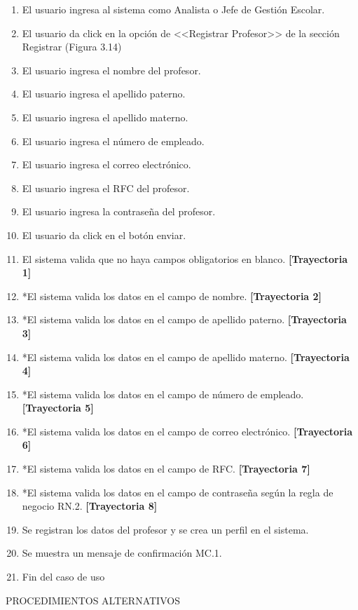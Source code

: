 \begin{enumerate}
    \item El usuario ingresa al sistema como Analista o Jefe de Gestión Escolar.
    \item El usuario da click en la opción de <<Registrar Profesor>> de la sección Registrar (Figura 3.14)
    \item El usuario ingresa el nombre del profesor.
    \item El usuario ingresa el apellido paterno.
    \item El usuario ingresa el apellido materno.
    \item El usuario ingresa el número de empleado.
    \item El usuario ingresa el correo electrónico.
    \item El usuario ingresa el RFC del profesor.
    \item El usuario ingresa la contraseña del profesor.
    \item El usuario da click en el botón enviar.
    \item El sistema valida que no haya campos obligatorios en blanco. \textbf{[Trayectoria 1]}
    \item *El sistema valida los datos en el campo de nombre. \textbf{[Trayectoria 2]}
    \item *El sistema valida los datos en el campo de apellido paterno. \textbf{[Trayectoria 3]}
    \item *El sistema valida los datos en el campo de apellido materno. \textbf{[Trayectoria 4]}
    \item *El sistema valida los datos en el campo de número de empleado. \textbf{[Trayectoria 5]}
    \item *El sistema valida los datos en el campo de correo electrónico. \textbf{[Trayectoria 6]}
    \item *El sistema valida los datos en el campo de RFC. \textbf{[Trayectoria 7]}
    \item *El sistema valida los datos en el campo de contraseña según la regla de negocio RN.2. \textbf{[Trayectoria 8]}
    \item Se registran los datos del profesor y se crea un perfil en el sistema.
    \item Se muestra un mensaje de confirmación MC.1.
    \item Fin del caso de uso
\end{enumerate}
\vspace*{1cm}
\Large{PROCEDIMIENTOS ALTERNATIVOS}\\

